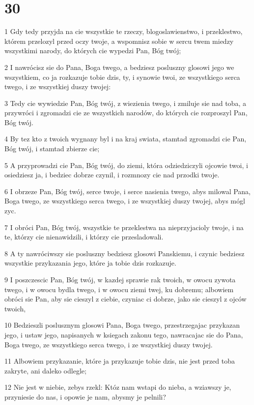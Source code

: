 \chapter{30}

\par 1 Gdy tedy przyjda na cie wszystkie te rzeczy, blogoslawienstwo, i przeklestwo, którem przelozyl przed oczy twoje, a wspomnisz sobie w sercu twem miedzy wszystkimi narody, do których cie wypedzi Pan, Bóg twój;
\par 2 I nawrócisz sie do Pana, Boga twego, a bedziesz posluszny glosowi jego we wszystkiem, co ja rozkazuje tobie dzis, ty, i synowie twoi, ze wszystkiego serca twego, i ze wszystkiej duszy twojej:
\par 3 Tedy cie wywiedzie Pan, Bóg twój, z wiezienia twego, i zmiluje sie nad toba, a przywróci i zgromadzi cie ze wszystkich narodów, do których cie rozproszyl Pan, Bóg twój.
\par 4 By tez kto z twoich wygnany byl i na kraj swiata, stamtad zgromadzi cie Pan, Bóg twój, i stamtad zbierze cie;
\par 5 A przyprowadzi cie Pan, Bóg twój, do ziemi, która odziedziczyli ojcowie twoi, i osiedziesz ja, i bedziec dobrze czynil, i rozmnozy cie nad przodki twoje.
\par 6 I obrzeze Pan, Bóg twój, serce twoje, i serce nasienia twego, abys milowal Pana, Boga twego, ze wszystkiego serca twego, i ze wszystkiej duszy twojej, abys mógl zyc.
\par 7 I obróci Pan, Bóg twój, wszystkie te przeklestwa na nieprzyjacioly twoje, i na te, którzy cie nienawidzili, i którzy cie przesladowali.
\par 8 A ty nawróciwszy sie posluszny bedziesz glosowi Panskiemu, i czynic bedziesz wszystkie przykazania jego, które ja tobie dzis rozkazuje.
\par 9 I poszczescic Pan, Bóg twój, w kazdej sprawie rak twoich, w owocu zywota twego, i w owocu bydla twego, i w owocu ziemi twej, ku dobremu; albowiem obróci sie Pan, aby sie cieszyl z ciebie, czyniac ci dobrze, jako sie cieszyl z ojców twoich,
\par 10 Bedzieszli poslusznym glosowi Pana, Boga twego, przestrzegajac przykazan jego, i ustaw jego, napisanych w ksiegach zakonu tego, nawracajac sie do Pana, Boga twego, ze wszystkiego serca twego, i ze wszystkiej duszy twojej.
\par 11 Albowiem przykazanie, które ja przykazuje tobie dzis, nie jest przed toba zakryte, ani daleko odlegle;
\par 12 Nie jest w niebie, zebys rzekl: Któz nam wstapi do nieba, a wziawszy je, przyniesie do nas, i opowie je nam, abysmy je pelnili?
